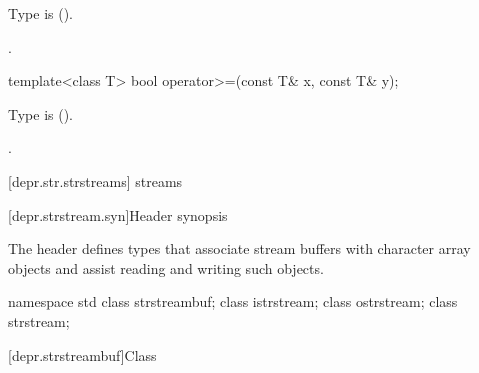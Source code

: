 \begin{itemdescr}
\pnum
\requires
Type  is  ().

\pnum
\returns
{}.
\end{itemdescr}

%
\begin{itemdecl}
template<class T> bool operator>=(const T& x, const T& y);
\end{itemdecl}

\begin{itemdescr}
\pnum
\requires
Type  is  ().

\pnum
\returns
{}.
\end{itemdescr}

[depr.str.strstreams]{ streams}

[depr.strstream.syn]{Header  synopsis}

\pnum
The header
%
defines types that associate stream buffers with
character array objects and assist reading and writing such objects.

\begin{codeblock}
namespace std {
  class strstreambuf;
  class istrstream;
  class ostrstream;
  class strstream;
}
\end{codeblock}

[depr.strstreambuf]{Class }

